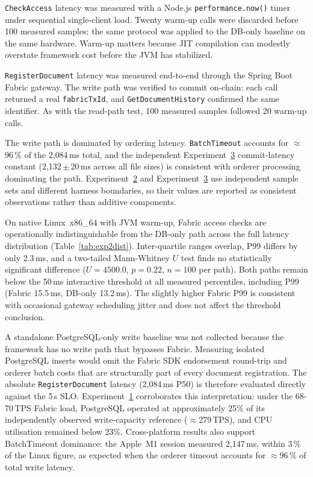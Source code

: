 \documentclass{ieeeaccess}
\begin{document}
\texttt{CheckAccess} latency was measured with a Node.js
\texttt{performance.now()} timer under sequential single-client load. Twenty
warm-up calls were discarded before 100 measured samples; the same protocol
was applied to the DB-only baseline on the same hardware. Warm-up matters
because JIT compilation can modestly overstate framework cost before the JVM
has stabilized.

\texttt{RegisterDocument} latency was measured end-to-end through the
Spring Boot Fabric gateway. The write path was verified to commit on-chain:
each call returned a real \texttt{fabricTxId}, and \texttt{GetDocumentHistory}
confirmed the same identifier. As with the read-path test, 100 measured
samples followed 20 warm-up calls.

The write path is dominated by ordering latency. \texttt{BatchTimeout}
accounts for $\approx$96\,\% of the 2{,}084\,ms total, and the independent
Experiment~\hyperref[sec:exp_filesize]{3} commit-latency constant (2{,}132\,$\pm$\,20\,ms across all
file sizes) is consistent with orderer processing dominating the path.
Experiment~\hyperref[sec:exp_latency]{2} and Experiment~\hyperref[sec:exp_filesize]{3} use independent sample sets and different
harness boundaries, so their values are reported as consistent observations
rather than additive components.

On native Linux~x86\_64 with JVM warm-up, Fabric access checks are
operationally indistinguishable from the DB-only path across the full
latency distribution (Table~\ref{tab:exp2dist}). Inter-quartile ranges
overlap, P99 differs by only 2.3\,ms, and a two-tailed Mann-Whitney $U$
test finds no statistically significant difference ($U = 4500.0$,
$p = 0.22$, $n = 100$ per path). Both paths remain below the 50\,ms
interactive threshold at all measured percentiles, including P99
(Fabric 15.5\,ms, DB-only 13.2\,ms). The slightly higher Fabric P99 is
consistent with occasional gateway scheduling jitter and does not affect
the threshold conclusion.

A standalone PostgreSQL-only write baseline was not collected because the
framework has no write path that bypasses Fabric. Measuring isolated
PostgreSQL inserts would omit the Fabric SDK endorsement round-trip and
orderer batch costs that are structurally part of every document
registration. The absolute \texttt{RegisterDocument} latency
(2{,}084\,ms P50) is therefore evaluated directly against the 5\,s SLO\@.
Experiment~\hyperref[sec:exp_scalability]{1} corroborates this interpretation: under the 68-70\,TPS Fabric
load, PostgreSQL operated at approximately 25\% of its independently
observed write-capacity reference ($\approx$279\,TPS), and CPU utilisation
remained below 23\%. Cross-platform results also support BatchTimeout
dominance: the Apple~M1 session measured 2{,}147\,ms, within 3\,\% of the
Linux figure, as expected when the orderer timeout accounts for
$\approx$96\,\% of total write latency.
\end{document}
